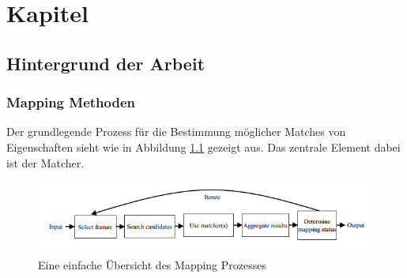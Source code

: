 %
\chapter{Kapitel}
\label{chap:chapters} 

		\section{Hintergrund der Arbeit}
		\subsection{Mapping Methoden}
		Der grundlegende Prozess für die Bestimmung möglicher Matches von Eigenschaften
		sieht wie in Abbildung \ref{fig1} gezeigt aus. Das zentrale Element dabei ist
		der Matcher. \cite{Hoo14}
		
		\begin{figure}[ht]
		\centering
		\includegraphics[width=1.0\textwidth]{pics/simple-high-level-view-of-a-mapping-process.png}
		\caption{Eine einfache Übersicht des Mapping Prozesses \cite{Hoo14}}
		\label{fig1}
		\end{figure}
		
